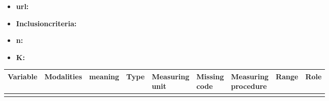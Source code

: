 

\begin{itemize}
         \item \textbf{url:}
         \item \textbf{Inclusioncriteria:}
         \item \textbf{n:}
         \item \textbf{K:}
\end{itemize}

\begin{table}[H]
         \centering
\begin{tabular}{@{}lllllllll@{}}
\toprule
Variable & Modalities & meaning & Type & \makecell{Measuring\\ unit} & \makecell{Missing\\ code} & \makecell{Measuring\\ procedure} & Range & Role \\ \midrule
         &            &         &      &                &              &                     &       &      \\ \bottomrule
\end{tabular}
\end{table}
